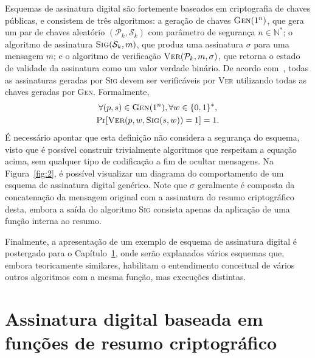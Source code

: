 \documentclass{ufsctex/ufsctex}
\newcommand{\binwds}[1]{\{0, 1\}^{#1}}
\begin{document}
Esquemas de assinatura digital são fortemente baseados em criptografia de
chaves públicas, e consistem de três algoritmos: a geração de chaves
$\textsc{Gen}(1^n)$, que gera um par de chaves aleatório $(\mathcal{P}_k,
\mathcal{S}_k)$ com parâmetro de segurança $n \in \mathbb{N}^{*}$; o algoritmo
de assinatura $\textsc{Sig}(\mathcal{S}_k, m)$, que produz uma assinatura
$\sigma$ para uma mensagem $m$; e o algoritmo de verificação
$\textsc{Ver}(\mathcal{P}_k, m, \sigma)$, que retorna o estado de validade da
assinatura como um valor verdade binário. De acordo
com~\cite{Goldreich:2004:FCV:975541}, todas as assinaturas geradas por
\textsc{Sig} devem ser verificáveis por \textsc{Ver} utilizando todas as chaves
geradas por \textsc{Gen}. Formalmente,
\begin{multline}
  \forall (p, s) \in \textsc{Gen}(1^n), \forall w \in \binwds{*}, \\
    \text{Pr}[\textsc{Ver}(p, w, \textsc{Sig}(s, w)) = 1] = 1.
\end{multline}
É necessário apontar que esta definição não considera a segurança do esquema,
visto que é possível construir trivialmente algoritmos que respeitam a equação
acima, sem qualquer tipo de codificação a fim de ocultar mensagens. Na
Figura~\ref{fig:2}, é possível visualizar um diagrama do comportamento de um
esquema de assinatura digital genérico. Note que $\sigma$ geralmente é composta
da concatenação da mensagem original com a assinatura do resumo criptográfico
desta, embora a saída do algoritmo \textsc{Sig} consista apenas da aplicação de
uma função interna ao resumo.

Finalmente, a apresentação de um exemplo de esquema de assinatura digital é
postergado para o Capítulo~\ref{chapter:hashsig}, onde serão explanados vários
esquemas que, embora teoricamente similares, habilitam o entendimento
conceitual de vários outros algoritmos com a mesma função, mas execuções
distintas.

\chapter{Assinatura digital baseada em
  funções de resumo criptográfico}\label{chapter:hashsig}
\end{document}
